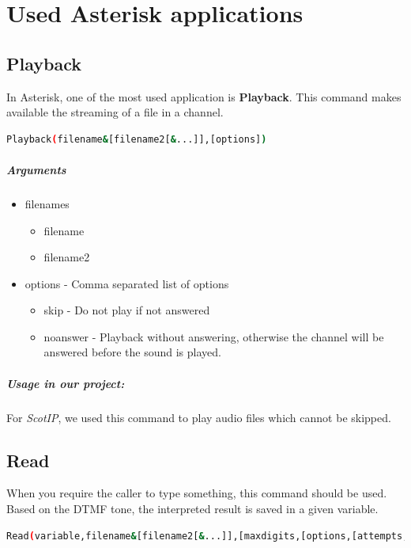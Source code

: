 \section{Used Asterisk applications}
\subsection{Playback}
In Asterisk, one of the most used application is \textbf{Playback}. This command makes available the streaming of a file in a channel. 


\begin{lstlisting}[language=bash,caption={Syntax of application Playback}]
Playback(filename&[filename2[&...]],[options])
\end{lstlisting}

\subparagraph{Arguments}
\begin{itemize}

	\item filenames
	\begin{itemize}
		\item filename
		\item filename2
	\end{itemize}
	
	\item options - Comma separated list of options
		\begin{itemize}
		\item skip - Do not play if not answered
		\item noanswer - Playback without answering, otherwise the channel will be answered before the sound is played.
		\end{itemize}
\end{itemize}

\subparagraph{Usage in our project:}
For \textit{ScotIP}, we used this command to play audio files which cannot be skipped.  




\subsection{Read}
When you require the caller to type something, this command should be used. Based on the DTMF tone, the interpreted result is saved in a given variable. 


\begin{lstlisting}[language=bash,caption={Syntax of application Read}]
Read(variable,filename&[filename2[&...]],[maxdigits,[options,[attempts,[timeout]]]]])
\end{lstlisting}

